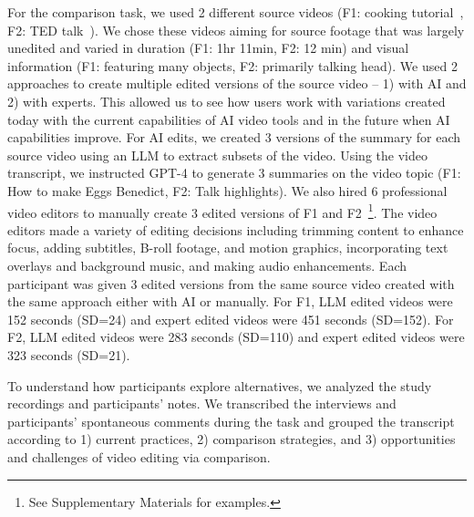 For the comparison task, we used 2 different source videos (F1: cooking tutorial~\cite{cooking_video}, F2: TED talk~\cite{ted_talk_video}).  We chose these videos aiming for source footage that was largely unedited and varied in duration (F1: 1hr 11min, F2: 12 min) and visual information (F1: featuring many objects, F2: primarily talking head).
We used 2 approaches to create multiple edited versions of the source video -- 1) with AI and 2) with experts. This allowed us to see how users work with variations created today with the current capabilities of AI video tools and in the future when AI capabilities improve.
For AI edits, we created 3 versions of the summary for each source video using an LLM to extract subsets of the video. 
Using the video transcript, we instructed GPT-4 to generate 3 summaries on the video topic (F1: How to make Eggs Benedict, F2: Talk highlights). 
We also hired 6 professional video editors to manually create 3 edited versions of F1 and F2~\footnote{See Supplementary Materials for examples.}.
The video editors made a variety of editing decisions including trimming content to enhance focus, adding subtitles, B-roll footage, and motion graphics, incorporating text overlays and background music, and making audio enhancements. Each participant was given 3 edited versions from the same source video created with the same approach either with AI or manually. For F1, LLM edited videos were 152 seconds (SD=24) and expert edited videos were 451 seconds (SD=152). For F2, LLM edited videos were 283 seconds (SD=110) and expert edited videos were 323 seconds (SD=21).


To understand how participants explore alternatives, we analyzed the study recordings and participants' notes. We transcribed the interviews and participants' spontaneous comments during the task and grouped the transcript according to 1) current practices, 2) comparison strategies, and 3) opportunities and challenges of video editing via comparison. 

